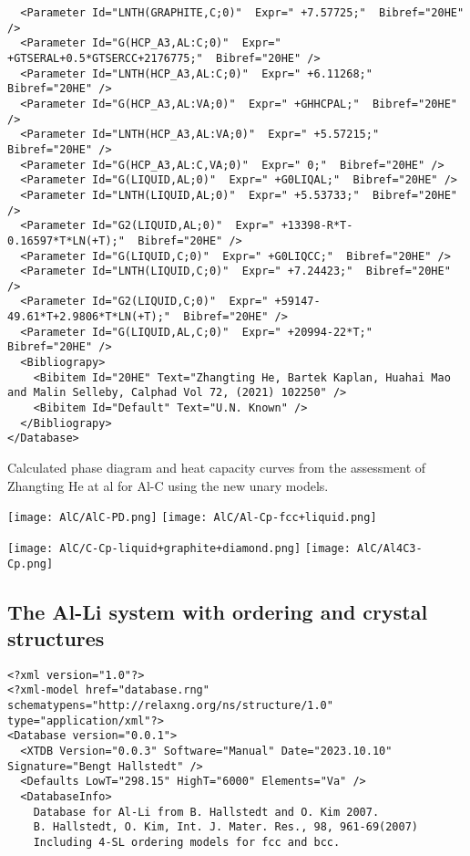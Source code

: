 \documentclass{article}
\begin{document}
\begin{appendices}
{\begin{verbatim}
  <Parameter Id="LNTH(GRAPHITE,C;0)"  Expr=" +7.57725;"  Bibref="20HE" />
  <Parameter Id="G(HCP_A3,AL:C;0)"  Expr=" +GTSERAL+0.5*GTSERCC+2176775;"  Bibref="20HE" />
  <Parameter Id="LNTH(HCP_A3,AL:C;0)"  Expr=" +6.11268;"  Bibref="20HE" />
  <Parameter Id="G(HCP_A3,AL:VA;0)"  Expr=" +GHHCPAL;"  Bibref="20HE" />
  <Parameter Id="LNTH(HCP_A3,AL:VA;0)"  Expr=" +5.57215;"  Bibref="20HE" />
  <Parameter Id="G(HCP_A3,AL:C,VA;0)"  Expr=" 0;"  Bibref="20HE" />
  <Parameter Id="G(LIQUID,AL;0)"  Expr=" +G0LIQAL;"  Bibref="20HE" />
  <Parameter Id="LNTH(LIQUID,AL;0)"  Expr=" +5.53733;"  Bibref="20HE" />
  <Parameter Id="G2(LIQUID,AL;0)"  Expr=" +13398-R*T-0.16597*T*LN(+T);"  Bibref="20HE" />
  <Parameter Id="G(LIQUID,C;0)"  Expr=" +G0LIQCC;"  Bibref="20HE" />
  <Parameter Id="LNTH(LIQUID,C;0)"  Expr=" +7.24423;"  Bibref="20HE" />
  <Parameter Id="G2(LIQUID,C;0)"  Expr=" +59147-49.61*T+2.9806*T*LN(+T);"  Bibref="20HE" />
  <Parameter Id="G(LIQUID,AL,C;0)"  Expr=" +20994-22*T;"  Bibref="20HE" />
  <Bibliograpy>
    <Bibitem Id="20HE" Text="Zhangting He, Bartek Kaplan, Huahai Mao and Malin Selleby, Calphad Vol 72, (2021) 102250" /> 
    <Bibitem Id="Default" Text="U.N. Known" /> 
  </Bibliograpy>
</Database>
\end{verbatim}
}

\newpage

Calculated phase diagram and heat capacity curves from the assessment
of Zhangting He at al for Al-C using the new unary models.

\texttt{[image: AlC/AlC-PD.png]}
\texttt{[image: AlC/Al-Cp-fcc+liquid.png]}

\texttt{[image: AlC/C-Cp-liquid+graphite+diamond.png]}
\texttt{[image: AlC/Al4C3-Cp.png]}

\newpage

\subsection{The Al-Li system with ordering and crystal structures}\label{sec:alli}

\begin{verbatim}
<?xml version="1.0"?>
<?xml-model href="database.rng" schematypens="http://relaxng.org/ns/structure/1.0" type="application/xml"?>
<Database version="0.0.1">
  <XTDB Version="0.0.3" Software="Manual" Date="2023.10.10" Signature="Bengt Hallstedt" />
  <Defaults LowT="298.15" HighT="6000" Elements="Va" />
  <DatabaseInfo>
    Database for Al-Li from B. Hallstedt and O. Kim 2007.
	B. Hallstedt, O. Kim, Int. J. Mater. Res., 98, 961-69(2007)
	Including 4-SL ordering models for fcc and bcc.
	

\end{verbatim}
\end{appendices}
\end{document}
